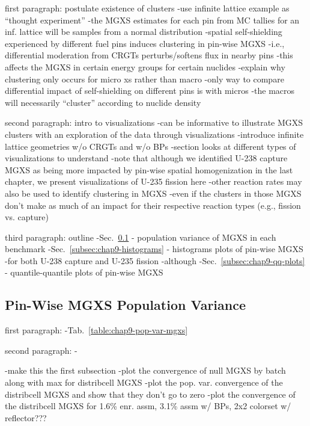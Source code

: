 first paragraph: postulate existence of clusters
-use infinite lattice example as ``thought experiment''
  -the \ac{MGXS} estimates for each pin from \ac{MC} tallies for an inf. lattice will be samples from a normal distribution
-spatial self-shielding experienced by different fuel pins induces clustering in pin-wise MGXS
  -i.e., differential moderation from \acp{CRGT} perturbs/softens flux in nearby pins
  -this affects the \ac{MGXS} in certain energy groups for certain nuclides
-explain why clustering only occurs for micro xs rather than macro
  -only way to compare differential impact of self-shielding on different pins is with micros
  -the macros will necessarily ``cluster'' according to nuclide density
  
second paragraph: intro to visualizations
-can be informative to illustrate \ac{MGXS} clusters with an exploration of the data through visualizations
-introduce infinite lattice geometries w/o \acp{CRGT} and w/o \acp{BP}
-section looks at different types of visualizations to understand
-note that although we identified U-238 capture \ac{MGXS} as being more impacted by pin-wise spatial homogenization in the last chapter, we present visualizations of U-235 fission here
  -other reaction rates may also be used to identify clustering in \ac{MGXS}
  -even if the clusters in those \ac{MGXS} don't make as much of an impact for their respective reaction types (e.g., fission vs. capture)

third paragraph: outline
-Sec.~\ref{subsec:chap9-pop-var} - population variance of \ac{MGXS} in each benchmark
-Sec.~\ref{subsec:chap9-histograms} - histograms plots of pin-wise \ac{MGXS}
  -for both U-238 capture and U-235 fission
  -although 
-Sec.~\ref{subsec:chap9-qq-plots} - quantile-quantile plots of pin-wise \ac{MGXS}

\subsection{Pin-Wise MGXS Population Variance}
\label{subsec:chap9-pop-var}

first paragraph:
-Tab.~\ref{table:chap9-pop-var-mgxs}

second paragraph:
-

-make this the first subsection
-plot the convergence of null MGXS by batch along with max for distribcell MGXS
-plot the pop. var. convergence of the distribcell MGXS and show that they don't go to zero
-plot the convergence of the distribcell MGXS for 1.6\% enr. assm, 3.1\% assm w/ BPs, 2x2 colorset w/ reflector???

